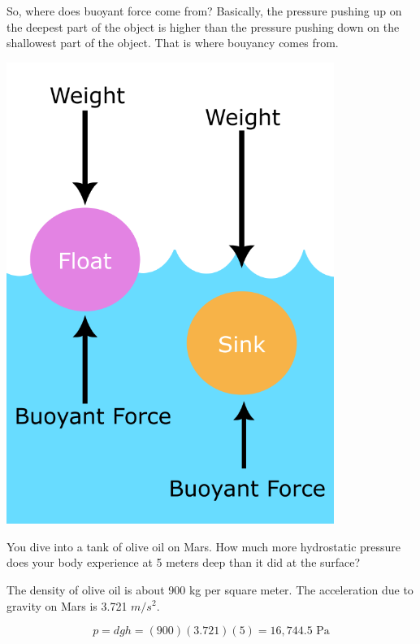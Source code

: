 So, where does buoyant force come from? Basically, the pressure pushing up on the
deepest part of the object is higher than the pressure pushing down on
the shallowest part of the object. That is where bouyancy comes from.

\includegraphics[width=0.8\textwidth]{Buoyancy_Diagram.png}


\begin{Exercise}[title={Hydrostatic Pressure}, label=mars_pressure]

  You dive into a tank of olive oil on Mars. How much more
  hydrostatic pressure does your body experience at 5 meters deep than
  it did at the surface?

  The density of olive oil is about 900 kg per square meter. The
  acceleration due to gravity on Mars is 3.721 $m/s^2$.
  
\end{Exercise}
\begin{Answer}[ref=mars_pressure]
$$p = d g h = (900)(3.721)(5) = 16,744.5 \text{ Pa}$$
\end{Answer}

